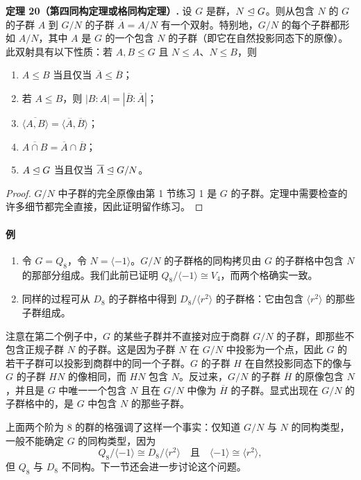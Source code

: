 \medskip
\noindent\textbf{定理 20（第四同构定理或格同构定理）.} 设 $G$ 是群，$N\trianglelefteq G$。则从包含 $N$ 的 $G$ 的子群 $A$ 到 $G/N$ 的子群 $\overline A=A/N$ 有一个双射。特别地，$G/N$ 的每个子群都形如 $A/N$，其中 $A$ 是 $G$ 的一个包含 $N$ 的子群（即它在自然投影同态下的原像）。此双射具有以下性质：若 $A,B\leq G$ 且 $N\leq A$、$N\leq B$，则
\begin{enumerate}[label=(\arabic*)]
  \item $A\leq B$ 当且仅当 $\overline A\leq \overline B$；
  \item 若 $A\leq B$，则 $|B:A|=|\overline B:\overline A|$；
  \item $\overline{\langle A,B\rangle}=\langle\overline A,\overline B\rangle$；
  \item $\overline{A\cap B}=\overline A\cap\overline B$；
  \item $A\trianglelefteq G$ 当且仅当 $\overline A\trianglelefteq G/N$。
\end{enumerate}

\begin{proof}
$G/N$ 中子群的完全原像由第 1 节练习 1 是 $G$ 的子群。定理中需要检查的许多细节都完全直接，因此证明留作练习。
\end{proof}

\paragraph{例}
\begin{enumerate}[label=(\arabic*)]
  \item 令 $G=Q_8$，令 $N=\langle -1\rangle$。$G/N$ 的子群格的同构拷贝由 $G$ 的子群格中包含 $N$ 的那部分组成。我们此前已证明 $Q_8/\langle -1\rangle\cong V_4$，而两个格确实一致。
  \item 同样的过程可从 $D_8$ 的子群格中得到 $D_8/\langle r^2\rangle$ 的子群格：它由包含 $\langle r^2\rangle$ 的那些子群组成。
\end{enumerate}

注意在第二个例子中，$G$ 的某些子群并不直接对应于商群 $G/N$ 的子群，即那些不包含正规子群 $N$ 的子群。这是因为子群 $N$ 在 $G/N$ 中投影为一个点，因此 $G$ 的若干子群可以投影到商群中的同一个子群。$G$ 的子群 $H$ 在自然投影同态下的像与 $G$ 的子群 $HN$ 的像相同，而 $HN$ 包含 $N$。反过来，$G/N$ 的子群 $\overline H$ 的原像包含 $N$，并且是 $G$ 中唯一一个包含 $N$ 且在 $G/N$ 中像为 $\overline H$ 的子群。显式出现在 $G/N$ 的子群格中的，是 $G$ 中包含 $N$ 的那些子群。

上面两个阶为 $8$ 的群的格强调了这样一个事实：仅知道 $G/N$ 与 $N$ 的同构类型，一般不能确定 $G$ 的同构类型，因为
\[
  Q_8/\langle -1\rangle\cong D_8/\langle r^2\rangle
  \quad\text{且}\quad
  \langle -1\rangle\cong\langle r^2\rangle,
\]
但 $Q_8$ 与 $D_8$ 不同构。下一节还会进一步讨论这个问题。

